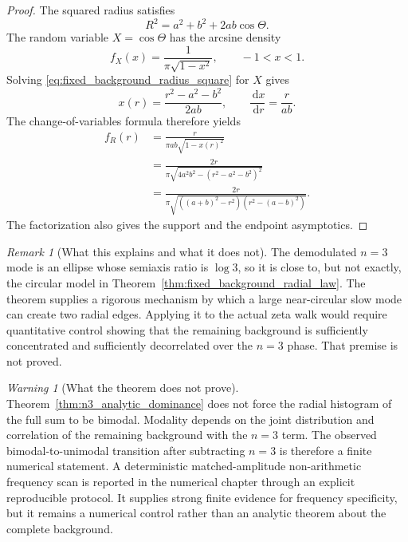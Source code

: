 \documentclass[11pt]{amsart}
\numberwithin{equation}{section}
\theoremstyle{plain}
\theoremstyle{definition}
\theoremstyle{remark}
\newtheorem{remark}[theorem]{Remark}
\newtheorem{warning}[theorem]{Warning}
\newcommand{\1}{\mathbf{1}}
\newcommand{\dd}{\,\mathrm{d}}
\begin{document}
\begin{proof}
The squared radius satisfies
\begin{equation}
R^2=a^2+b^2+2ab\cos\Theta.
\label{eq:fixed_background_radius_square}
\end{equation}
The random variable \(X=\cos\Theta\) has the arcsine density
\begin{equation}
f_X(x)=\frac1{\pi\sqrt{1-x^2}},
\qquad -1<x<1.
\label{eq:arcsine_cosine_density}
\end{equation}
Solving \eqref{eq:fixed_background_radius_square} for \(X\) gives
\begin{equation}
x(r)=\frac{r^2-a^2-b^2}{2ab},
\qquad
\frac{\dd x}{\dd r}=\frac{r}{ab}.
\label{eq:radial_change_variables}
\end{equation}
The change-of-variables formula therefore yields
\begin{align}
f_R(r)
&=
\frac{r}{\pi ab\sqrt{1-x(r)^2}}
\label{eq:radial_density_first_form}
\\
&=
\frac{2r}
{\pi\sqrt{4a^2b^2-(r^2-a^2-b^2)^2}}
\label{eq:radial_density_second_form}
\\
&=
\frac{2r}
{\pi\sqrt{((a+b)^2-r^2)(r^2-(a-b)^2)}}.
\label{eq:radial_density_factorized}
\end{align}
The factorization also gives the support and the endpoint asymptotics.
\end{proof}

\begin{remark}[What this explains and what it does not]
\label{rem:n3_fixed_background_mechanism}
The demodulated \(n=3\) mode is an ellipse whose semiaxis ratio is
\(\log3\), so it is close to, but not exactly, the circular model in
Theorem~\ref{thm:fixed_background_radial_law}.  The theorem supplies a
rigorous mechanism by which a large near-circular slow mode can create two
radial edges.  Applying it to the actual zeta walk would require quantitative
control showing that the remaining background is sufficiently concentrated
and sufficiently decorrelated over the \(n=3\) phase.  That premise is not
proved.
\end{remark}

\begin{warning}[What the theorem does not prove]
\label{warn:n3_bimodality_not_analytic}
Theorem~\ref{thm:n3_analytic_dominance} does not force the radial histogram
of the full sum to be bimodal.  Modality depends on the joint distribution
and correlation of the remaining background with the $n=3$ term.  The
observed bimodal-to-unimodal transition after subtracting $n=3$ is therefore
a finite numerical statement.  A deterministic matched-amplitude non-arithmetic frequency scan is
reported in the numerical chapter through an explicit reproducible protocol.
It supplies strong finite evidence for frequency specificity, but it remains
a numerical control rather than an analytic theorem about the complete
background.
\end{warning}
\end{document}
